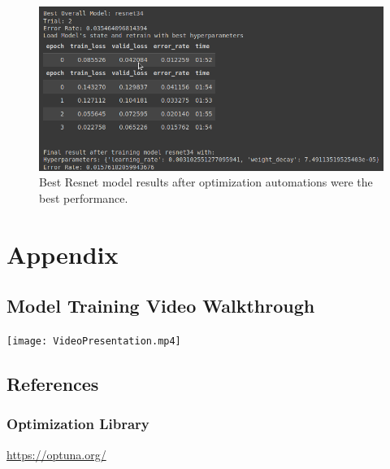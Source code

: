 \documentclass[
  letterpaper,
  DIV=11,
  numbers=noendperiod]{scrartcl}
\begin{document}
\begin{figure}

{\centering \includegraphics{resnetbestresults.png}

}

\caption{\label{fig-best}Best Resnet model results after optimization
automations were the best performance.}

\end{figure}

\hypertarget{appendix}{%
\section*{Appendix}\label{appendix}}

\hypertarget{model-training-video-walkthrough}{%
\subsection*{Model Training Video
Walkthrough}\label{model-training-video-walkthrough}}

\texttt{[image: VideoPresentation.mp4]}

\hypertarget{references}{%
\subsection*{References}\label{references}}

\hypertarget{optimization-library}{%
\subsubsection*{Optimization Library}\label{optimization-library}}

\url{https://optuna.org/}
\end{document}
